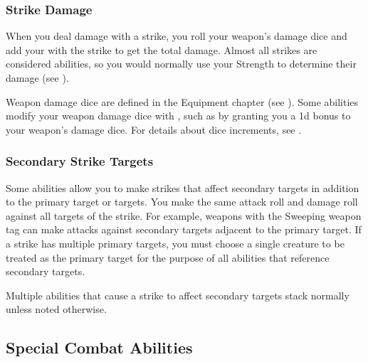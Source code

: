         \subsubsection{Strike Damage}\label{Strike Damage}
            When you deal damage with a strike, you roll your weapon's damage dice and add your  with the strike to get the total damage.
            Almost all strikes are considered  abilities, so you would normally use your Strength to determine their damage (see ).

            Weapon damage dice are defined in the Equipment chapter (see ).
            Some abilities modify your weapon damage dice with , such as by granting you a \plus1d bonus to your weapon's damage dice.
            For details about dice increments, see .

        \subsubsection{Secondary Strike Targets}\label{Secondary Strike Targets}
            Some abilities allow you to make strikes that affect secondary targets in addition to the primary target or targets.
            You make the same attack roll and damage roll against all targets of the strike.
            For example, weapons with the Sweeping weapon tag can make attacks against secondary targets adjacent to the primary target.
            If a strike has multiple primary targets, you must choose a single creature to be treated as the primary target for the purpose of all abilities that reference secondary targets.

            Multiple abilities that cause a strike to affect secondary targets stack normally unless noted otherwise.

    \subsection{Special Combat Abilities}\label{Special Combat Abilities}


